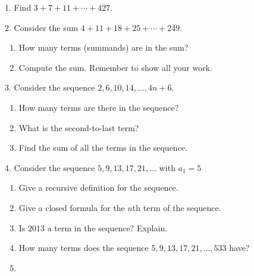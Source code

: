 \documentclass[10pt,]{book}
\theoremstyle{plain}
\theoremstyle{definition}
\theoremstyle{definition}
\theoremstyle{definition}
\numberwithin{equation}{chapter}
\begin{document}
\begin{exerciselist}
\item[1.]\hypertarget{exercise-188}{}
            Find \(3 + 7 + 11+ \cdots + 427\).
\par\smallskip
\item[2.]\hypertarget{exercise-189}{}
            Consider the sum \(4 + 11 + 18 + 25 + \cdots + 249\).
\leavevmode%
\begin{enumerate}[label=(\alph*)]
\item\hypertarget{li-955}{}
                How many terms (summands) are in the sum?
\item\hypertarget{li-956}{}
                Compute the sum. Remember to show all your work.
\end{enumerate}
\par\smallskip
\item[3.]\hypertarget{exercise-190}{}
            Consider the sequence \(2, 6, 10, 14, \ldots, 4n + 6\).
\leavevmode%
\begin{enumerate}[label=(\alph*)]
\item\hypertarget{li-959}{}
                How many terms are there in the sequence?
\item\hypertarget{li-960}{}
                What is the second-to-last term?
\item\hypertarget{li-961}{}
                Find the sum of all the terms in the sequence.
\end{enumerate}
\par\smallskip
\item[4.]\hypertarget{exercise-191}{}
            Consider the sequence \(5, 9, 13, 17, 21, \ldots\) with \(a_1 = 5\)
\leavevmode%
\begin{enumerate}[label=(\alph*)]
\item\hypertarget{li-965}{}
                Give a recursive definition for the sequence.
\item\hypertarget{li-966}{}
                Give a closed formula for the \(n\)th term of the sequence.
\item\hypertarget{li-967}{}
                Is \(2013\) a term in the sequence? Explain.
\item\hypertarget{li-968}{}
                How many terms does the sequence \(5, 9, 13, 17, 21, \ldots, 533\) have?
\item\hypertarget{li-969}{}

\end{enumerate}
\end{exerciselist}
\end{document}
